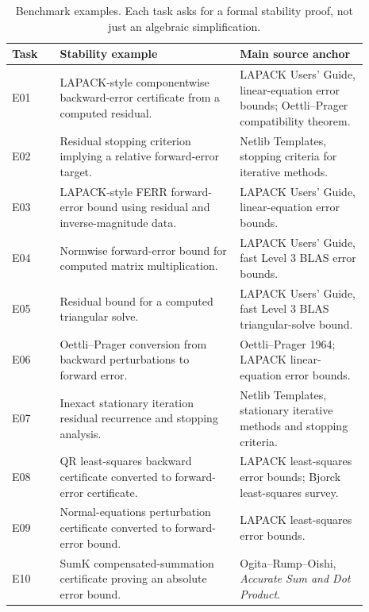 \documentclass[10pt]{article}
\begin{document}
\begin{table}[h]
\centering
\footnotesize
\begin{tabular}{p{0.12\linewidth}p{0.45\linewidth}p{0.32\linewidth}}
\toprule
Task & Stability example & Main source anchor \\
\midrule
E01 & LAPACK-style componentwise backward-error certificate from a computed residual. &
LAPACK Users' Guide, linear-equation error bounds; Oettli--Prager compatibility theorem. \\
E02 & Residual stopping criterion implying a relative forward-error target. &
Netlib Templates, stopping criteria for iterative methods. \\
E03 & LAPACK-style FERR forward-error bound using residual and inverse-magnitude data. &
LAPACK Users' Guide, linear-equation error bounds. \\
E04 & Normwise forward-error bound for computed matrix multiplication. &
LAPACK Users' Guide, fast Level 3 BLAS error bounds. \\
E05 & Residual bound for a computed triangular solve. &
LAPACK Users' Guide, fast Level 3 BLAS triangular-solve bound. \\
E06 & Oettli--Prager conversion from backward perturbations to forward error. &
Oettli--Prager 1964; LAPACK linear-equation error bounds. \\
E07 & Inexact stationary iteration residual recurrence and stopping analysis. &
Netlib Templates, stationary iterative methods and stopping criteria. \\
E08 & QR least-squares backward certificate converted to forward-error certificate. &
LAPACK least-squares error bounds; Bjorck least-squares survey. \\
E09 & Normal-equations perturbation certificate converted to forward-error bound. &
LAPACK least-squares error bounds. \\
E10 & SumK compensated-summation certificate proving an absolute error bound. &
Ogita--Rump--Oishi, \emph{Accurate Sum and Dot Product}. \\
\bottomrule
\end{tabular}
\caption{Benchmark examples.  Each task asks for a formal stability proof, not
just an algebraic simplification.}
\end{table}
\end{document}
